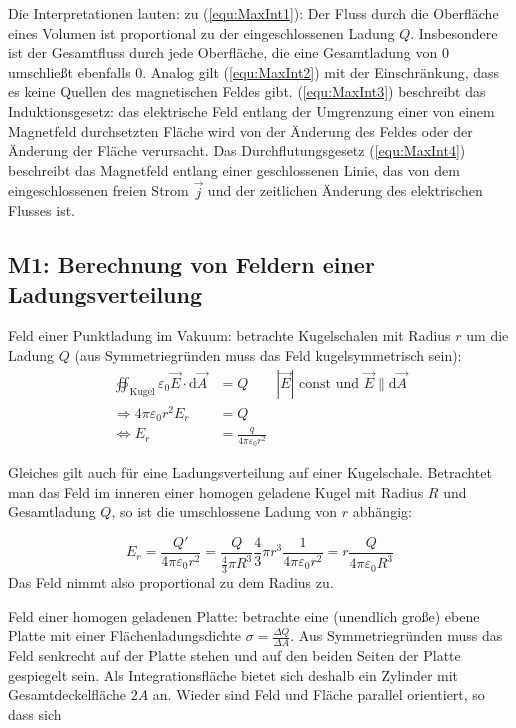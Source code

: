 \documentclass[a4paper]{scrartcl}
\begin{document}
Die Interpretationen lauten: zu (\ref{equ:MaxInt1}): Der Fluss durch die Oberfläche eines Volumen ist proportional zu der eingeschlossenen Ladung $Q$. Insbesondere ist der Gesamtfluss durch jede Oberfläche, die eine Gesamtladung von 0 umschließt ebenfalls 0. Analog gilt (\ref{equ:MaxInt2}) mit der Einschränkung, dass es keine Quellen des magnetischen Feldes gibt. (\ref{equ:MaxInt3}) beschreibt das Induktionsgesetz: das elektrische Feld entlang der Umgrenzung einer von einem Magnetfeld durchsetzten Fläche wird von der Änderung des Feldes oder der Änderung der Fläche verursacht.
Das Durchflutungsgesetz (\ref{equ:MaxInt4}) beschreibt das Magnetfeld entlang einer geschlossenen Linie, das von dem eingeschlossenen freien Strom $\vec j$ und der zeitlichen Änderung des elektrischen Flusses ist.

\subsection{M1: Berechnung von Feldern einer Ladungsverteilung}
Feld einer Punktladung im Vakuum: betrachte Kugelschalen mit Radius $r$ um die Ladung $Q$ (aus Symmetriegründen muss das Feld kugelsymmetrisch sein):
\begin{align*}
  \oiint_\text{Kugel} \varepsilon_0 \vec E \cdot \text{d}\vec A & = Q  \qquad |\vec E| \text{ const und } \vec E \parallel \text{d}\vec A\\
  \Rightarrow 4\pi \varepsilon_0 r^2 E_r & = Q \\
  \Leftrightarrow E_r & = \frac{q}{4\pi \varepsilon_0 r^2}
\end{align*}

Gleiches gilt auch für eine Ladungsverteilung auf einer Kugelschale. Betrachtet man das Feld im inneren einer homogen geladene Kugel mit Radius $R$ und Gesamtladung $Q$, so ist die umschlossene Ladung von $r$ abhängig:

\begin{equation*}
  E_r = \frac{Q'}{4\pi\varepsilon_0 r^2} = \frac{Q}{\frac{4}{3}\pi R^3} \frac{4}{3}\pi r^3 \frac{1}{4\pi \varepsilon_0 r^2} = r \frac{Q}{4\pi\varepsilon_0 R^3}
\end{equation*}
Das Feld nimmt also proportional zu dem Radius zu.

Feld einer homogen geladenen Platte: betrachte eine (unendlich große) ebene Platte mit einer Flächenladungsdichte $\sigma = \frac{\Delta Q}{\Delta A}$. Aus Symmetriegründen muss das Feld senkrecht auf der Platte stehen und auf den beiden Seiten der Platte gespiegelt sein. Als Integrationsfläche bietet sich deshalb ein Zylinder mit Gesamtdeckelfläche $2A$ an. Wieder sind Feld und Fläche parallel orientiert, so dass sich
\end{document}
